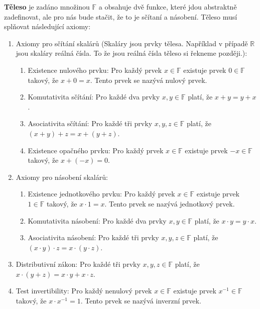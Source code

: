 \begin{definitionbox}
  \textbf{Těleso} je zadáno množinou $\mathbb{F}$ a obsahuje dvě funkce, které jdou abstraktně zadefinovat, ale pro nás bude stačit, že to je sčítaní a násobení. Těleso musí splňovat následující axiomy:

  \begin{enumerate}
    \item Axiomy pro sčítání skalárů (Skaláry jsou prvky tělesa. Například v případě $\mathbb{R}$ jsou skaláry reálná čísla. To že jsou reálná čísla těleso si řekneme později.):
    \begin{enumerate}
      \item Existence nulového prvku: Pro každý prvek $x\in\mathbb{F}$ existuje prvek $0\in\mathbb{F}$ takový, že $x + 0 = x$. Tento prvek se nazývá nulový prvek.
      \item Komutativita sčítání: Pro každé dva prvky $x, y\in\mathbb{F}$ platí, že $x + y = y + x$.
      \item Asociativita sčítání: Pro každé tři prvky $x, y, z\in\mathbb{F}$ platí, že $(x + y) + z = x + (y + z)$.
      \item Existence opačného prvku: Pro každý prvek $x\in\mathbb{F}$ existuje prvek $-x\in\mathbb{F}$ takový, že $x + (-x) = 0$.
    \end{enumerate}
    \item Axiomy pro násobení skalárů:
    \begin{enumerate}
      \item Existence jednotkového prvku: Pro každý prvek $x\in\mathbb{F}$ existuje prvek $1\in\mathbb{F}$ takový, že $x\cdot 1 = x$. Tento prvek se nazývá jednotkový prvek.
      \item Komutativita násobení: Pro každé dva prvky $x, y\in\mathbb{F}$ platí, že $x\cdot y = y\cdot x$.
      \item Asociativita násobení: Pro každé tři prvky $x, y, z\in\mathbb{F}$ platí, že $(x\cdot y)\cdot z = x\cdot (y\cdot z)$.
    \end{enumerate}
    \item Distributivní zákon: Pro každé tři prvky $x, y, z\in\mathbb{F}$ platí, že $x\cdot (y + z) = x\cdot y + x\cdot z$.
    \item Test invertibility: Pro každý nenulový prvek $x\in\mathbb{F}$ existuje prvek $x^{-1}\in\mathbb{F}$ takový, že $x\cdot x^{-1} = 1$. Tento prvek se nazývá inverzní prvek.
  \end{enumerate}
  

\end{definitionbox}

